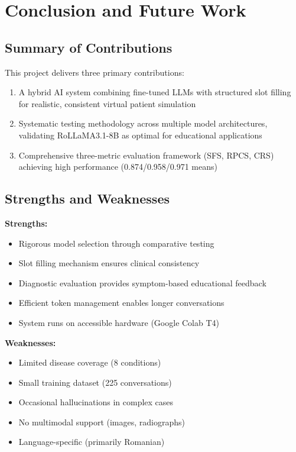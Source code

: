 \documentclass[runningheads,a4paper,11pt]{report}
\begin{document}
\chapter{Conclusion and Future Work}
\label{chapter:concl}

\section{Summary of Contributions}

This project delivers three primary contributions:

\begin{enumerate}
\item A hybrid AI system combining fine-tuned LLMs with structured slot filling for realistic, consistent virtual patient simulation
\item Systematic testing methodology across multiple model architectures, validating RoLLaMA3.1-8B as optimal for educational applications
\item Comprehensive three-metric evaluation framework (SFS, RPCS, CRS) achieving high performance (0.874/0.958/0.971 means)
\end{enumerate}

\section{Strengths and Weaknesses}

\textbf{Strengths:}
\begin{itemize}
\item Rigorous model selection through comparative testing
\item Slot filling mechanism ensures clinical consistency
\item Diagnostic evaluation provides symptom-based educational feedback
\item Efficient token management enables longer conversations
\item System runs on accessible hardware (Google Colab T4)
\end{itemize}

\textbf{Weaknesses:}
\begin{itemize}
\item Limited disease coverage (8 conditions)
\item Small training dataset (225 conversations)
\item Occasional hallucinations in complex cases
\item No multimodal support (images, radiographs)
\item Language-specific (primarily Romanian)
\end{itemize}
\end{document}
